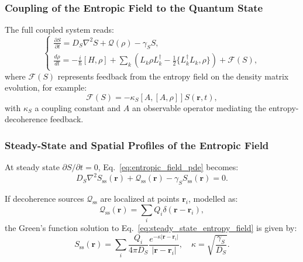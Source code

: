 \documentclass[12pt]{article}
\begin{document}
\subsubsection*{Coupling of the Entropic Field to the Quantum State}

The full coupled system reads:
\begin{equation}
\boxed{
\begin{cases}
\displaystyle \frac{\partial S}{\partial t} = D_S \nabla^2 S + \mathcal{Q}(\rho) - \gamma_S S, \\
\displaystyle \frac{d \rho}{dt} = -\frac{i}{\hbar}[H, \rho] + \sum_k \left( L_k \rho L_k^\dagger - \frac{1}{2} \{ L_k^\dagger L_k, \rho \} \right) + \mathcal{F}(S),
\end{cases}
}
\label{eq:coupled_entropy_density_and_rho}
\end{equation}
where \(\mathcal{F}(S)\) represents feedback from the entropy field on the density matrix evolution, for example:
\begin{equation}
\mathcal{F}(S) = - \kappa_S [A, [A, \rho]] S(\mathbf{r}, t),
\label{eq:entropy_feedback}
\end{equation}
with \(\kappa_S\) a coupling constant and \(A\) an observable operator mediating the entropy-decoherence feedback.

\subsubsection*{Steady-State and Spatial Profiles of the Entropic Field}

At steady state \(\partial S / \partial t = 0\), Eq.~\eqref{eq:entropic_field_pde} becomes:
\begin{equation}
D_S \nabla^2 S_{\mathrm{ss}}(\mathbf{r}) + \mathcal{Q}_{\mathrm{ss}}(\mathbf{r}) - \gamma_S S_{\mathrm{ss}}(\mathbf{r}) = 0.
\label{eq:steady_state_entropy_field}
\end{equation}

If decoherence sources \(\mathcal{Q}_{\mathrm{ss}}\) are localized at points \(\mathbf{r}_i\), modelled as:
\begin{equation}
\mathcal{Q}_{\mathrm{ss}}(\mathbf{r}) = \sum_i Q_i \delta(\mathbf{r} - \mathbf{r}_i),
\label{eq:localized_entropy_sources}
\end{equation}
the Green’s function solution to Eq.~\eqref{eq:steady_state_entropy_field} is given by:
\begin{equation}
S_{\mathrm{ss}}(\mathbf{r}) = \sum_i \frac{Q_i}{4 \pi D_S} \frac{e^{-\kappa |\mathbf{r} - \mathbf{r}_i|}}{|\mathbf{r} - \mathbf{r}_i|}, \quad \kappa = \sqrt{\frac{\gamma_S}{D_S}}.
\label{eq:steady_state_entropy_solution}
\end{equation}
\end{document}
